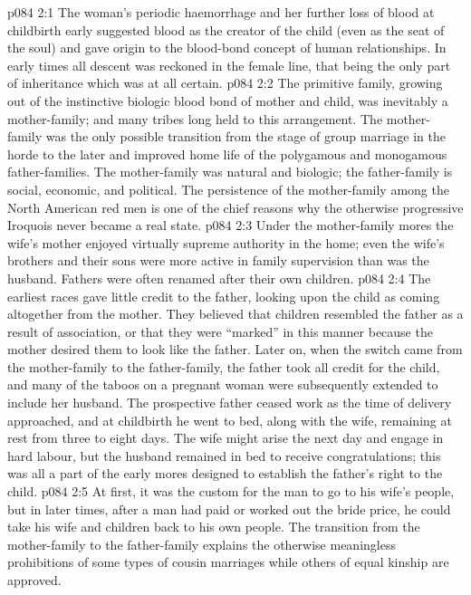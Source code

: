 \vs p084 2:1 The woman’s periodic haemorrhage and her further loss of blood at childbirth early suggested blood as the creator of the child (even as the seat of the soul) and gave origin to the blood\hyp{}bond concept of human relationships. In early times all descent was reckoned in the female line, that being the only part of inheritance which was at all certain.
\vs p084 2:2 The primitive family, growing out of the instinctive biologic blood bond of mother and child, was inevitably a mother\hyp{}family; and many tribes long held to this arrangement. The mother\hyp{}family was the only possible transition from the stage of group marriage in the horde to the later and improved home life of the polygamous and monogamous father\hyp{}families. The mother\hyp{}family was natural and biologic; the father\hyp{}family is social, economic, and political. The persistence of the mother\hyp{}family among the North American red men is one of the chief reasons why the otherwise progressive Iroquois never became a real state.
\vs p084 2:3 Under the mother\hyp{}family mores the wife’s mother enjoyed virtually supreme authority in the home; even the wife’s brothers and their sons were more active in family supervision than was the husband. Fathers were often renamed after their own children.
\vs p084 2:4 The earliest races gave little credit to the father, looking upon the child as coming altogether from the mother. They believed that children resembled the father as a result of association, or that they were “marked” in this manner because the mother desired them to look like the father. Later on, when the switch came from the mother\hyp{}family to the father\hyp{}family, the father took all credit for the child, and many of the taboos on a pregnant woman were subsequently extended to include her husband. The prospective father ceased work as the time of delivery approached, and at childbirth he went to bed, along with the wife, remaining at rest from three to eight days. The wife might arise the next day and engage in hard labour, but the husband remained in bed to receive congratulations; this was all a part of the early mores designed to establish the father’s right to the child.
\vs p084 2:5 At first, it was the custom for the man to go to his wife’s people, but in later times, after a man had paid or worked out the bride price, he could take his wife and children back to his own people. The transition from the mother\hyp{}family to the father\hyp{}family explains the otherwise meaningless prohibitions of some types of cousin marriages while others of equal kinship are approved.
